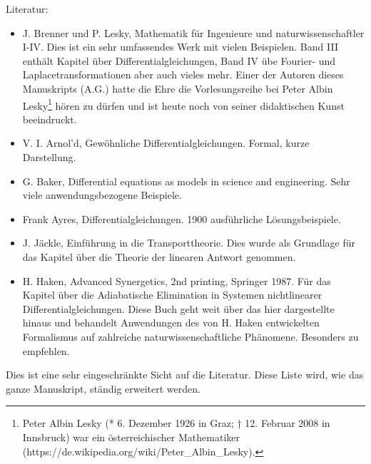 \documentclass[a4paper,12pt]{book}%
\begin{document}
Literatur:
\begin{itemize}
  \item J. Brenner und P. Lesky, Mathematik für Ingenieure und
    naturwissenschaftler I-IV. Dies ist ein sehr umfassendes Werk mit vielen
    Beispielen. Band III enthält Kapitel über Differentialgleichungen, Band IV
    übe Fourier- und Laplacetransformationen aber auch vieles mehr. Einer der
    Autoren dieses Manuskripts (A.G.) hatte die Ehre die Vorlesungsreihe bei
    Peter Albin Lesky\footnote{Peter Albin Lesky (* 6. Dezember 1926 in Graz; †
    12. Februar 2008 in Innsbruck) war ein österreichischer Mathematiker
    (https://de.wikipedia.org/wiki/Peter\_Albin\_Lesky). } hören zu dürfen und ist
    heute noch von seiner didaktischen Kunst beeindruckt.
  \item V. I. Arnol'd, Gewöhnliche Differentialgleichungen. Formal, kurze
    Darstellung.
  \item G. Baker, Differential equations as models in science and engineering.
    Sehr viele anwendungsbezogene Beispiele.
  \item Frank Ayres, Differentialgleichungen. 1900 ausführliche Lösungsbeispiele.
  \item J. Jäckle, Einführung in die Transporttheorie. Dies wurde als Grundlage
    für das Kapitel über die Theorie der linearen Antwort genommen.
  \item H. Haken, Advanced Synergetics, 2nd printing, Springer 1987. Für das
    Kapitel über die Adiabatische Elimination in Systemen nichtlinearer
    Differentialgleichungen. Diese Buch geht weit über das hier dargestellte
    hinaus und behandelt Anwendungen des von H. Haken entwickelten Formalismus
    auf zahlreiche naturwissenschaftliche Phänomene. Besonders zu empfehlen.
\end{itemize}
Dies ist eine sehr eingeschränkte Sicht auf die Literatur. Diese Liste wird,
wie das ganze Manuskript, ständig erweitert werden.
\newpage
\tableofcontents
\newpage 
\mainmatter








%
%
\begin{appendices}
\noappendicestocpagenum
\renewcommand\appendixtocname{Anhang}
\renewcommand\appendixpagename{Anhang}


\end{appendices}
\end{document}
